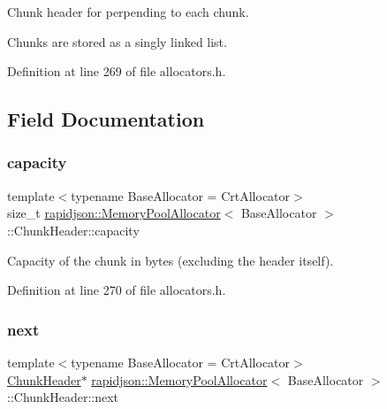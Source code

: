 Chunk header for perpending to each chunk. 

Chunks are stored as a singly linked list. 

Definition at line 269 of file allocators.\+h.



\subsection{Field Documentation}
\mbox{\label{structrapidjson_1_1_memory_pool_allocator_1_1_chunk_header_a2bce5ae3d208e501af06b36fe34411cf}} 
\subsubsection{\texorpdfstring{capacity}{capacity}}
{\footnotesize\ttfamily template$<$typename Base\+Allocator = Crt\+Allocator$>$ \\
size\+\_\+t \mbox{\hyperlink{classrapidjson_1_1_memory_pool_allocator}{rapidjson\+::\+Memory\+Pool\+Allocator}}$<$ Base\+Allocator $>$\+::Chunk\+Header\+::capacity}



Capacity of the chunk in bytes (excluding the header itself). 



Definition at line 270 of file allocators.\+h.

\mbox{\label{structrapidjson_1_1_memory_pool_allocator_1_1_chunk_header_a448b562df88b314ee8e751b2146b8682}} 
\subsubsection{\texorpdfstring{next}{next}}
{\footnotesize\ttfamily template$<$typename Base\+Allocator = Crt\+Allocator$>$ \\
\mbox{\hyperlink{structrapidjson_1_1_memory_pool_allocator_1_1_chunk_header}{Chunk\+Header}}$\ast$ \mbox{\hyperlink{classrapidjson_1_1_memory_pool_allocator}{rapidjson\+::\+Memory\+Pool\+Allocator}}$<$ Base\+Allocator $>$\+::Chunk\+Header\+::next}



